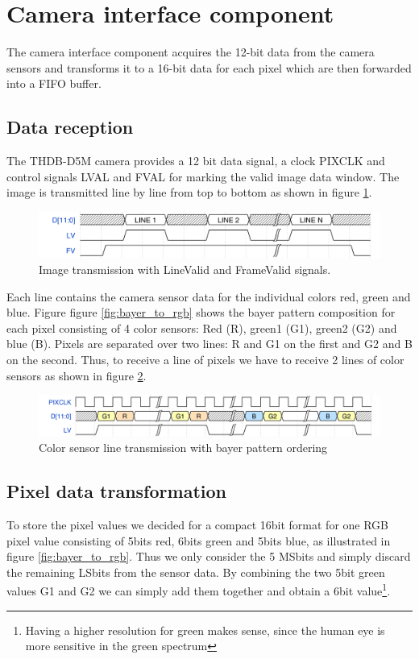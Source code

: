 \documentclass{article}
\begin{document}
\section{Camera interface component}

The camera interface component acquires the 12-bit data from the camera sensors and transforms it to a 16-bit data for each pixel which are then forwarded into a FIFO buffer.

\subsection{Data reception}
The THDB-D5M camera provides a 12 bit data signal, a clock PIXCLK and control signals LVAL and FVAL for marking the valid image data window.
The image is transmitted line by line from top to bottom as shown in figure \ref{fig:image_transmission}.

\begin{figure}[H]
\centering
\includegraphics[width=\textwidth]{img/image_transmission.png}
\caption{Image transmission with LineValid and FrameValid signals.}
\label{fig:image_transmission}
\end{figure}

Each line contains the camera sensor data for the individual colors red, green and blue.
Figure figure \ref{fig:bayer_to_rgb} shows the bayer pattern composition for each pixel consisting of 4 color sensors: Red (R), green1 (G1), green2 (G2) and blue (B).
Pixels are separated over two lines: R and G1 on the first and G2 and B on the second.
Thus, to receive a line of pixels we have to receive 2 lines of color sensors as shown in figure \ref{fig:line_transmission}.

\begin{figure}[H]
\centering
\includegraphics[width=\textwidth]{img/line_transmission.png}
\caption{Color sensor line transmission with bayer pattern ordering}
\label{fig:line_transmission}
\end{figure}

\subsection{Pixel data transformation}
To store the pixel values we decided for a compact 16bit format for one RGB pixel value consisting of 5bits red, 6bits green and 5bits blue, as illustrated in figure \ref{fig:bayer_to_rgb}.
Thus we only consider the 5 MSbits and simply discard the remaining LSbits from the sensor data.
By combining the two 5bit green values G1 and G2 we can simply add them together and obtain a 6bit value\footnote{Having a higher resolution for green makes sense, since the human eye is more sensitive in the green spectrum}.
\end{document}
